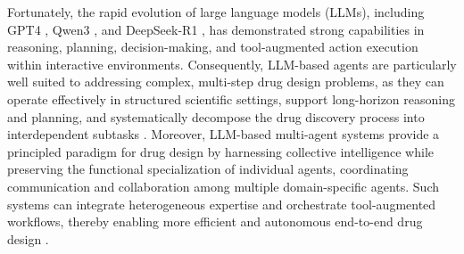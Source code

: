 \documentclass{article}
\begin{document}
Fortunately, the rapid evolution of large language models (LLMs), including GPT4 \cite{achiam2023gpt}, Qwen3 \cite{yang2025qwen3}, and DeepSeek-R1 \cite{guo2025deepseek}, has demonstrated strong capabilities in reasoning, planning, decision-making, and tool-augmented action execution within interactive environments. Consequently, LLM-based agents are particularly well suited to addressing complex, multi-step drug design problems, as they can operate effectively in structured scientific settings, support long-horizon reasoning and planning, and systematically decompose the drug discovery process into interdependent subtasks \cite{gao2024empowering}. Moreover, LLM-based multi-agent systems provide a principled paradigm for drug design by harnessing collective intelligence while preserving the functional specialization of individual agents, coordinating communication and collaboration among multiple domain-specific agents. Such systems can integrate heterogeneous expertise and orchestrate tool-augmented workflows, thereby enabling more efficient and autonomous end-to-end drug design \cite{zhao2025llm}.
\end{document}
